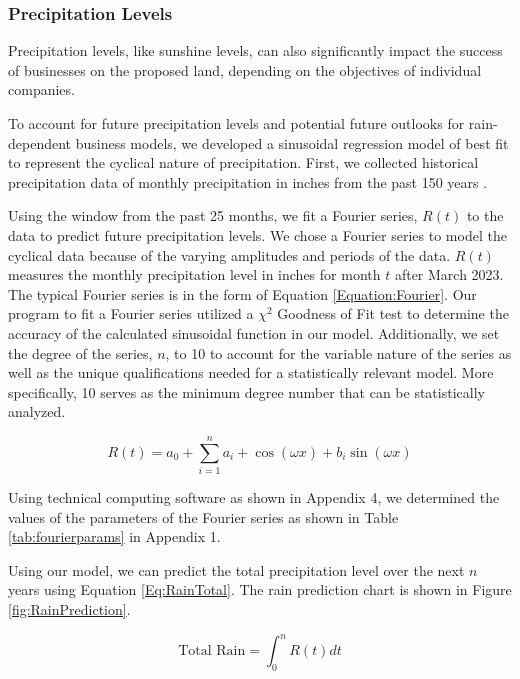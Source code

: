 \documentclass{mcmthesis}
\begin{document}
\subsubsection{Precipitation Levels}
Precipitation levels, like sunshine levels, can also significantly impact the success of businesses on the proposed land, depending on the objectives of individual companies.

To account for future precipitation levels and potential future outlooks for rain-dependent business models, we developed a sinusoidal regression model of best fit to represent the cyclical nature of precipitation. First, we collected historical precipitation data of monthly precipitation in inches from the past 150 years \cite{aladin_wolcott_nodate}. 

Using the window from the past 25 months, we fit a Fourier series, $R(t)$ to the data to predict future precipitation levels. We chose a Fourier series to model the cyclical data because of the varying amplitudes and periods of the data. $R(t)$ measures the monthly precipitation level in inches for month $t$ after March 2023. The typical Fourier series is in the form of Equation \ref{Equation:Fourier}. Our program to fit a Fourier series utilized a $\chi^2$ Goodness of Fit test to determine the accuracy of the calculated sinusoidal function in our model. Additionally, we set the degree of the series, $n$, to 10 to account for the variable nature of the series as well as the unique qualifications needed for a statistically relevant model. More specifically, 10 serves as the minimum degree number that can be statistically analyzed.

\begin{equation}
R(t) =a_0+\sum_{i=1}^{n}a_i + \cos(\omega x)+b_i \sin(\omega x)
\label{Equation:Fourier}
\end{equation}

Using technical computing software as shown in Appendix 4, we determined the values of the parameters of the Fourier series as shown in Table \ref{tab:fourierparams} in Appendix 1.

Using our model, we can predict the total precipitation level over the next $n$ years using Equation \ref{Eq:RainTotal}. The rain prediction chart is shown in Figure \ref{fig:RainPrediction}.

\begin{equation}
    \text{Total Rain} = \int_0^n R(t) dt
    \label{Eq:RainTotal}
\end{equation}
\end{document}

